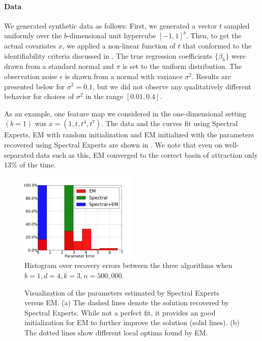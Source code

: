 \paragraph{Data}

We generated synthetic data as follows:
First, we generated a vector $t$ sampled uniformly over the $b$-dimensional
unit hypercube $[-1,1]^b$.
Then, to get the actual covariates $x$, we applied a non-linear function of $t$
that conformed to the identifiability criteria discussed in
.
The true regression coefficients $\{\beta_h\}$ were drawn from a standard normal
and $\pi$ is set to the uniform distribution.
The observation noise $\epsilon$ is drawn from a normal with variance $\sigma^2$.
Results are presented below for $\sigma^2 = 0.1$, but we did not observe any
qualitatively different behavior for choices of $\sigma^2$ in the range
$[0.01, 0.4]$.  

As an example, one feature map we considered in the one-dimensional
setting $(b=1)$ was $x = (1, t, t^4, t^7)$. The data and the curves fit using
Spectral Experts, EM with random initialization and EM initialized with
the parameters recovered using Spectral Experts are shown in
. We note that even on well-separated data such as
this, EM converged to the correct basin of attraction only 13\% of the time.

\begin{figure}[t]
  \centering
  \includegraphics[width=0.50\textwidth]{figures/EM-Spectral-Spectral+EM-hist.pdf}
  \caption{Histogram over recovery errors between the three algorithms when $b = 1, d = 4, k = 3, n = 500,000$.}
  \label{fig:hist}
\end{figure}


\begin{figure}[p]
  \centering
  \subfigure[Spectral, Spectral+EM]{
    \texttt{[image: figures/Spectral-Spectral+EM-1833.pdf]}}
    \hspace{-2em}
  \subfigure[EM]{
    \texttt{[image: figures/EM-1833.pdf]}}
  \caption{Visualization of the parameters estimated by Spectral Experts versus EM.
  (a) The dashed lines denote the solution recovered by Spectral Experts. While
  not a perfect fit, it provides an good initialization for EM to further improve the solution (solid lines).
  (b) The dotted lines show different local optima found by EM.}
  \label{fig:curves}
\end{figure}

